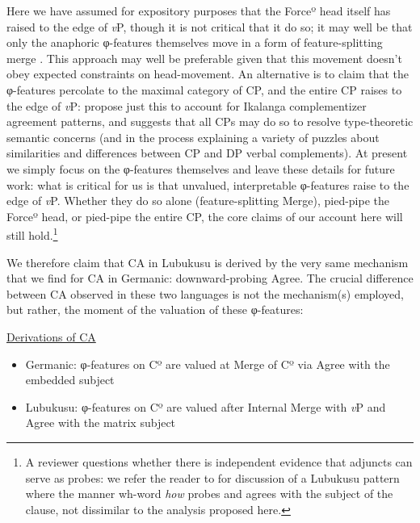 \documentclass[output=paper
,modfonts
,nonflat
]{langsci/langscibook}
\begin{document}
\noindent Here we have assumed for expository purposes that the Forceº head itself has raised to the edge of \textit{v}P, though it is not critical that it do so; it may well be that only the anaphoric φ-features themselves move in a form of feature-splitting merge \citep{Obata:2011}. This approach may well be preferable given that this movement doesn't obey expected constraints on head-movement. An alternative is to claim that the φ-features percolate to the maximal category of CP, and the entire CP raises to the edge of \textit{v}P: \citet{LetsholoSafir:2017} propose just this to account for Ikalanga complementizer agreement patterns, and \citet{Moulton:2015} suggests that all CPs may do so to resolve type-theoretic semantic concerns (and in the process explaining a variety of puzzles about similarities and differences between CP and DP verbal complements). At present we simply focus on the φ-features themselves and leave these details for future work: what is critical for us is that unvalued, interpretable φ-features raise to the edge of \textit{v}P. Whether they do so alone (feature-splitting Merge), pied-pipe the Forceº head, or pied-pipe the entire CP, the core claims of our account here will still hold.\footnote{A reviewer questions whether there is independent evidence that adjuncts can serve as probes: we refer the reader to \citet{CarstensDiercks:2013a} for discussion of a Lubukusu pattern where the manner wh-word \textit{how} probes and agrees with the subject of the clause, not dissimilar to the analysis proposed here.} 

We therefore claim that CA in Lubukusu is derived by the very same mechanism that we find for CA in Germanic: downward-probing Agree. The crucial difference between CA observed in these two languages is not the mechanism(s) employed, but rather, the moment of the valuation of these φ-features:

\newpage 
\ea \underline{Derivations of CA}
\begin{itemize}
\item Germanic: φ-features on Cº are valued at Merge of Cº via Agree with the embedded subject
\item Lubukusu: φ-features on Cº are valued after Internal Merge with \textit{v}P and Agree with the matrix subject
\end{itemize}
\z
\end{document}
